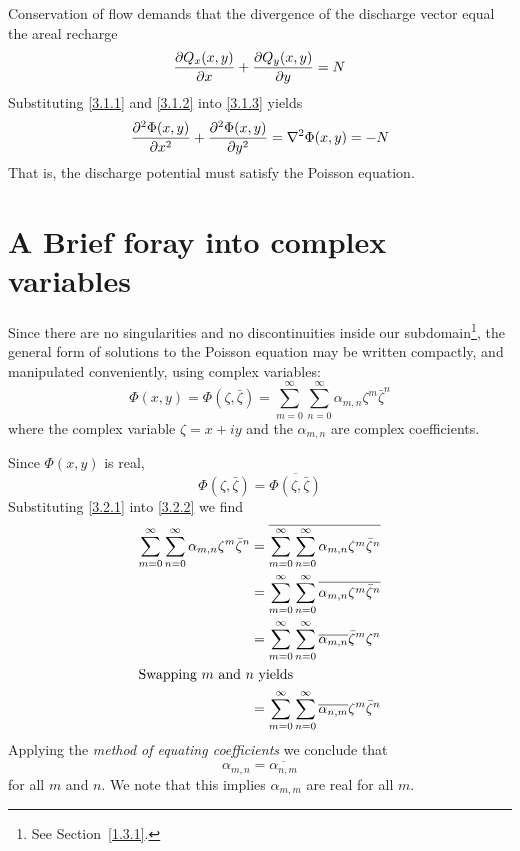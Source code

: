 \documentclass[12pt]{report}
\providecommand{\pderiv}[2]{\frac{\mathinner{\partial#1}}{\mathinner{\partial#2}}}
\providecommand{\ppderiv}[2]{\frac{\mathinner{\partial^2#1}}{\mathinner{\partial#2^2}}}
\begin{document}
Conservation of flow demands that the divergence of the discharge vector equal the areal recharge \citep[e.g.][(3.151)]{Haitjema1995}
%
\begin{equation}\label{3.1.3}
    \pderiv{Q_x(x,y)}{x} + \pderiv{Q_y(x,y)}{y} = N
\end{equation}
%
Substituting \eqref{3.1.1} and \eqref{3.1.2} into \eqref{3.1.3} yields
%
\begin{equation}\label{3.1.4}
    \ppderiv{\Phi(x,y)}{x} + \ppderiv{\Phi(x,y)}{y} = \nabla^2 \Phi(x,y) = -N
\end{equation}
%
That is, the discharge potential must satisfy the Poisson equation.


\section{A Brief foray into complex variables}
Since there are no singularities and no discontinuities inside our subdomain\footnote{See Section~\ref{1.3.1}.}, the general form of solutions to the Poisson equation may be written compactly, and manipulated conveniently, using complex variables:
%
\begin{equation}\label{3.2.1}
    \Phi(x,y) = \Phi(\zeta, \bar{\zeta}) = \sum_{m=0}^{\infty} \sum_{n=0}^{\infty} \alpha_{m,n} \zeta^m \bar{\zeta}^n
\end{equation}
%
where the complex variable $\zeta = x + i y$ and the $\alpha_{m,n}$ are complex coefficients.

Since $\Phi(x,y)$ is real,
%
\begin{equation}\label{3.2.2}
    \Phi(\zeta, \bar{\zeta}) = \overline{\Phi(\zeta, \bar{\zeta})}
\end{equation}
%
Substituting \eqref{3.2.1} into \eqref{3.2.2} we find
%
\begin{align}
    \sum_{m=0}^{\infty} \sum_{n=0}^{\infty} \alpha_{m,n} \zeta^m \bar{\zeta}^n
    &= \overline{\sum_{m=0}^{\infty} \sum_{n=0}^{\infty} \alpha_{m,n} \zeta^m \bar{\zeta}^n} \\
    &= \sum_{m=0}^{\infty} \sum_{n=0}^{\infty} \overline{\alpha_{m,n} \zeta^m \bar{\zeta}^n} \\
    &= \sum_{m=0}^{\infty} \sum_{n=0}^{\infty} \overline{\alpha_{m,n}} \bar{\zeta}^m \zeta^n \\
    \intertext{Swapping $m$ and $n$ yields}
    &= \sum_{m=0}^{\infty} \sum_{n=0}^{\infty} \overline{\alpha_{n,m}} \zeta^m \bar{\zeta}^n
\end{align}
%
Applying the {\em method of equating coefficients} \citep[page 273]{Clapham2009} we conclude that
%
\begin{equation}\label{3.2.3}
    \alpha_{m,n} = \overline{\alpha_{n,m}}
\end{equation}
%
for all $m$ and $n$. We note that this implies $\alpha_{m,m}$ are real for all $m$.
\end{document}
